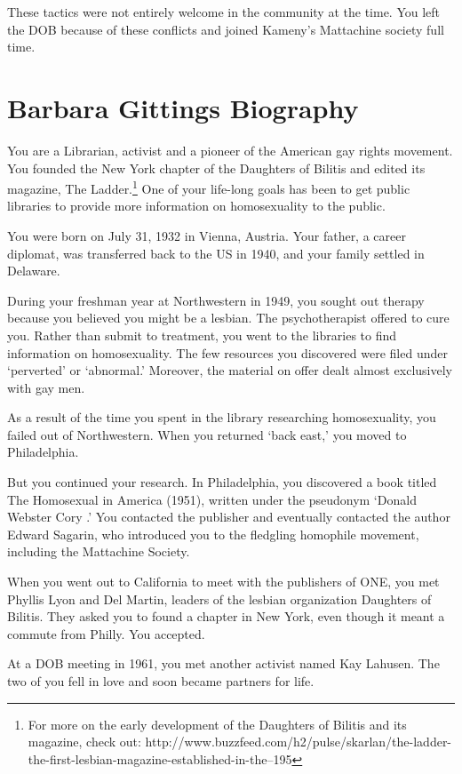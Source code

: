\begin{refsection}
These tactics were not entirely welcome in the community at the time. You left the DOB because of these conflicts and joined Kameny's Mattachine society full time.

\section{Barbara Gittings Biography}
\label{barbaragittingsbiography}

You are a Librarian, activist and a pioneer of the American gay rights movement. You founded the New York chapter of the Daughters of Bilitis and edited its magazine, The Ladder.\footnote{For more on the early development of the Daughters of Bilitis and its magazine, check out: http:\slash \slash www.buzzfeed.com\slash h2\slash pulse\slash skarlan\slash the-ladder-the-first-lesbian-magazine-established-in-the--195} One of your life-long goals has been to get public libraries to provide more information on homosexuality to the public.

You were born on July 31, 1932 in Vienna, Austria. Your father, a career diplomat, was transferred back to the US in 1940, and your family settled in Delaware.

During your freshman year at Northwestern in 1949, you sought out therapy because you believed you might be a lesbian. The psychotherapist offered to cure you. Rather than submit to treatment, you went to the libraries to find information on homosexuality. The few resources you discovered were filed under `perverted' or `abnormal.' Moreover, the material on offer dealt almost exclusively with gay men.

As a result of the time you spent in the library researching homosexuality, you failed out of Northwestern. When you returned `back east,' you moved to Philadelphia.

But you continued your research. In Philadelphia, you discovered a book titled The Homosexual in America (1951), written under the pseudonym `Donald Webster Cory .' You contacted the publisher and eventually contacted the author Edward Sagarin, who introduced you to the fledgling homophile movement, including the Mattachine Society.

When you went out to California to meet with the publishers of ONE, you met Phyllis Lyon and Del Martin, leaders of the lesbian organization Daughters of Bilitis. They asked you to found a chapter in New York, even though it meant a commute from Philly. You accepted. 

At a DOB meeting in 1961, you met another activist named Kay Lahusen. The two of you fell in love and soon became partners for life.


\end{refsection}
